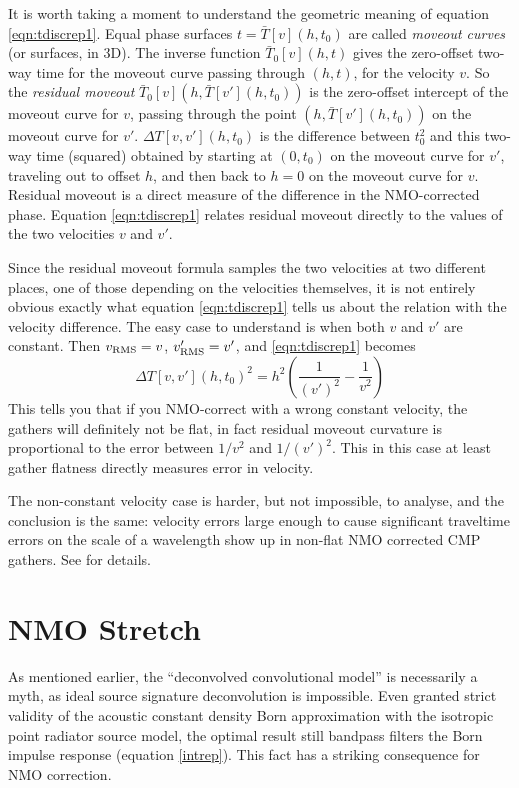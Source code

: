 It is worth taking a moment to understand the geometric meaning of equation \ref{eqn:tdiscrep1}. Equal phase surfaces $t=\bar{T}[v](h,t_0)$ are called {\em moveout curves} (or surfaces, in 3D). The inverse function $\bar{T}_0[v](h,t)$ gives the zero-offset two-way time for the moveout curve passing through $(h,t)$, for the velocity $v$. So the {\em residual moveout} $\bar{T}_0[v](h,\bar{T}[v'](h,t_0))$ is the zero-offset intercept of the moveout curve for $v$, passing through the point $(h,\bar{T}[v'](h,t_0))$ on the moveout curve for $v'$. $\Delta T[v,v'](h,t_0)$ is the difference between $t_0^2$ and this two-way time (squared) obtained by starting at $(0,t_0)$ on the moveout curve for $v'$, traveling out to offset $h$, and then back to $h=0$ on the moveout curve for $v$. Residual moveout is a direct measure of the difference in the NMO-corrected phase. Equation \ref{eqn:tdiscrep1} relates residual moveout directly to the values of the two velocities $v$ and $v'$.

Since the residual moveout formula samples the two velocities at two different places, one of those depending on the velocities themselves, it is not entirely obvious exactly what equation \ref{eqn:tdiscrep1} tells us about the relation with the velocity difference. The easy case to understand is when both $v$ and $v'$ are constant. Then $v_{\rm RMS} = v$, $v'_{\rm RMS} = v'$, and  \ref{eqn:tdiscrep1} becomes
\begin{equation}
\label{eqn:tdiscrepcv}
\Delta T[v,v'](h,t_0)^2 =  h^2\left(\frac{1}{(v')^2}-\frac{1}{v^2} \right)
\end{equation}
This tells you that if you NMO-correct with a wrong constant velocity, the gathers will definitely not be flat, in fact residual moveout curvature is proportional to the error between $1/v^2$ and $1/(v')^2$. This in this case at least gather flatness directly measures error in velocity. 

The non-constant velocity case is harder, but not impossible, to analyse, and the conclusion is the same: velocity errors large enough to cause significant traveltime errors on the scale of a wavelength show up in non-flat NMO corrected CMP gathers. See \cite[]{Symes:99a} for details.

\section{NMO Stretch}
As mentioned earlier, the ``deconvolved convolutional model'' is necessarily a myth, as ideal source signature deconvolution is impossible. Even granted strict validity of the acoustic constant density Born approximation with the isotropic point radiator source model, the optimal result still bandpass filters the Born impulse response (equation \ref{intrep}). This fact has a striking consequence for NMO correction. 

